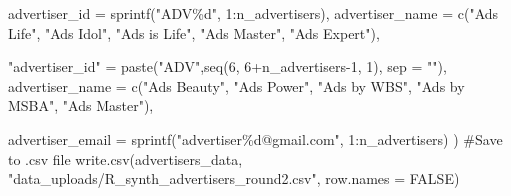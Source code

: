 \documentclass[
  letterpaper,
  DIV=11,
  numbers=noendperiod]{scrartcl}
\newenvironment{Shaded}{\begin{snugshade}}{\end{snugshade}}
\newcommand{\AttributeTok}[1]{\textcolor[rgb]{0.40,0.45,0.13}{#1}}
\newcommand{\CommentTok}[1]{\textcolor[rgb]{0.37,0.37,0.37}{#1}}
\newcommand{\ConstantTok}[1]{\textcolor[rgb]{0.56,0.35,0.01}{#1}}
\newcommand{\DecValTok}[1]{\textcolor[rgb]{0.68,0.00,0.00}{#1}}
\newcommand{\FunctionTok}[1]{\textcolor[rgb]{0.28,0.35,0.67}{#1}}
\newcommand{\NormalTok}[1]{\textcolor[rgb]{0.00,0.23,0.31}{#1}}
\newcommand{\OtherTok}[1]{\textcolor[rgb]{0.00,0.23,0.31}{#1}}
\newcommand{\SpecialCharTok}[1]{\textcolor[rgb]{0.37,0.37,0.37}{#1}}
\newcommand{\StringTok}[1]{\textcolor[rgb]{0.13,0.47,0.30}{#1}}
\begin{document}
\begin{Shaded}
\begin{Highlighting}[numbers=left,,]
  \AttributeTok{advertiser\_id =} \FunctionTok{sprintf}\NormalTok{(}\StringTok{"ADV\%d"}\NormalTok{, }\DecValTok{1}\SpecialCharTok{:}\NormalTok{n\_advertisers),}
  \AttributeTok{advertiser\_name =} \FunctionTok{c}\NormalTok{(}\StringTok{"Ads Life"}\NormalTok{, }\StringTok{"Ads Idol"}\NormalTok{, }\StringTok{"Ads is Life"}\NormalTok{, }
                      \StringTok{"Ads Master"}\NormalTok{, }\StringTok{"Ads Expert"}\NormalTok{),}

  \StringTok{"advertiser\_id"} \OtherTok{=} \FunctionTok{paste}\NormalTok{(}\StringTok{"ADV"}\NormalTok{,}\FunctionTok{seq}\NormalTok{(}\DecValTok{6}\NormalTok{, }\DecValTok{6}\SpecialCharTok{+}\NormalTok{n\_advertisers}\DecValTok{{-}1}\NormalTok{, }\DecValTok{1}\NormalTok{), }\AttributeTok{sep =} \StringTok{""}\NormalTok{),}
  \AttributeTok{advertiser\_name =} \FunctionTok{c}\NormalTok{(}\StringTok{"Ads Beauty"}\NormalTok{, }\StringTok{"Ads Power"}\NormalTok{, }\StringTok{"Ads by WBS"}\NormalTok{, }\StringTok{"Ads by MSBA"}\NormalTok{, }\StringTok{"Ads Master"}\NormalTok{),}

  \AttributeTok{advertiser\_email =} \FunctionTok{sprintf}\NormalTok{(}\StringTok{"advertiser\%d@gmail.com"}\NormalTok{, }\DecValTok{1}\SpecialCharTok{:}\NormalTok{n\_advertisers)}
\NormalTok{)}
\CommentTok{\#Save to .csv file}
\FunctionTok{write.csv}\NormalTok{(advertisers\_data, }\StringTok{"data\_uploads/R\_synth\_advertisers\_round2.csv"}\NormalTok{, }\AttributeTok{row.names =} \ConstantTok{FALSE}\NormalTok{)}


\end{Highlighting}
\end{Shaded}
\end{document}
